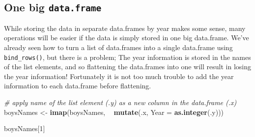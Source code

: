 \documentclass[]{book}
\newenvironment{Shaded}{\begin{snugshade}}{\end{snugshade}}
\newcommand{\KeywordTok}[1]{\textcolor[rgb]{0.13,0.29,0.53}{\textbf{#1}}}
\newcommand{\DataTypeTok}[1]{\textcolor[rgb]{0.13,0.29,0.53}{#1}}
\newcommand{\DecValTok}[1]{\textcolor[rgb]{0.00,0.00,0.81}{#1}}
\newcommand{\StringTok}[1]{\textcolor[rgb]{0.31,0.60,0.02}{#1}}
\newcommand{\CommentTok}[1]{\textcolor[rgb]{0.56,0.35,0.01}{\textit{#1}}}
\newcommand{\OperatorTok}[1]{\textcolor[rgb]{0.81,0.36,0.00}{\textbf{#1}}}
\newcommand{\NormalTok}[1]{#1}
\begin{document}
\begin{Shaded}
\end{Shaded}

\subsection{\texorpdfstring{One big
\texttt{data.frame}}{One big data.frame}}\label{one-big-data.frame}

While storing the data in separate data.frames by year makes some sense,
many operations will be easier if the data is simply stored in one big
data.frame. We've already seen how to turn a list of data.frames into a
single data.frame using \texttt{bind\_rows()}, but there is a problem;
The year information is stored in the names of the list elements, and so
flattening the data.frames into one will result in losing the year
information! Fortunately it is not too much trouble to add the year
information to each data.frame before flattening.

\begin{Shaded}
\begin{Highlighting}[]
\CommentTok{# apply name of the list element (.y) as a new column in the data.frame (.x)}
\NormalTok{boysNames <-}\StringTok{ }\KeywordTok{imap}\NormalTok{(boysNames, }\OperatorTok{~}\StringTok{ }\KeywordTok{mutate}\NormalTok{(.x, }\DataTypeTok{Year =} \KeywordTok{as.integer}\NormalTok{(.y)))}

\NormalTok{boysNames[}\DecValTok{1}\NormalTok{]}
\end{Highlighting}
\end{Shaded}
\end{document}
